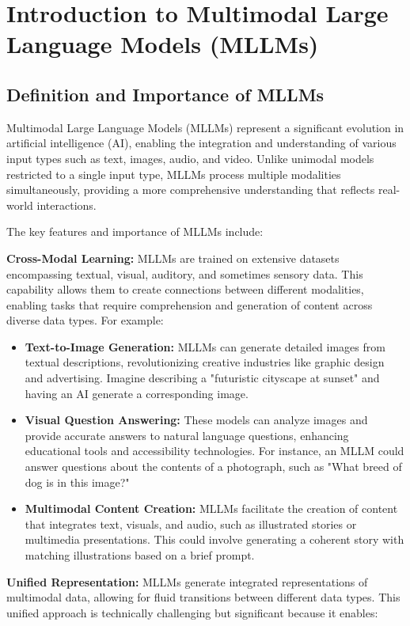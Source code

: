 \chapter{Introduction to Multimodal Large Language Models (MLLMs)}

\section{Definition and Importance of MLLMs}

Multimodal Large Language Models (MLLMs) represent a significant evolution in artificial intelligence (AI), enabling the integration and understanding of various input types such as text, images, audio, and video. Unlike unimodal models restricted to a single input type, MLLMs process multiple modalities simultaneously, providing a more comprehensive understanding that reflects real-world interactions.

The key features and importance of MLLMs include:

\textbf{Cross-Modal Learning:} MLLMs are trained on extensive datasets encompassing textual, visual, auditory, and sometimes sensory data. This capability allows them to create connections between different modalities, enabling tasks that require comprehension and generation of content across diverse data types. For example:

\begin{itemize}
    \item \textbf{Text-to-Image Generation:} MLLMs can generate detailed images from textual descriptions, revolutionizing creative industries like graphic design and advertising. Imagine describing a "futuristic cityscape at sunset" and having an AI generate a corresponding image.
    \item \textbf{Visual Question Answering:} These models can analyze images and provide accurate answers to natural language questions, enhancing educational tools and accessibility technologies. For instance, an MLLM could answer questions about the contents of a photograph, such as "What breed of dog is in this image?"
    \item \textbf{Multimodal Content Creation:} MLLMs facilitate the creation of content that integrates text, visuals, and audio, such as illustrated stories or multimedia presentations. This could involve generating a coherent story with matching illustrations based on a brief prompt.
\end{itemize}

\textbf{Unified Representation:} MLLMs generate integrated representations of multimodal data, allowing for fluid transitions between different data types. This unified approach is technically challenging but significant because it enables:


